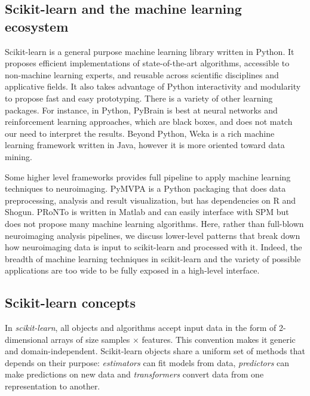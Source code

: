 \documentclass{frontiersSCNS} %
\begin{document}
\subsection{Scikit-learn and the machine learning ecosystem}

Scikit-learn \citep{pedregosa2011} is a general purpose machine learning
library written in Python.
It proposes efficient implementations of state-of-the-art algorithms,
accessible to non-machine learning experts,
and reusable across scientific disciplines and applicative fields. It also
takes advantage of Python interactivity and modularity to propose fast and easy
prototyping. There is a variety of other learning packages. For instance,
in Python, PyBrain \citep{schaul2010pybrain} is best at neural networks
and reinforcement learning approaches, which are black boxes, and does not match
our need to interpret the results.
Beyond Python, Weka \citep{hall2009weka} is a rich machine learning framework
written in Java,
however it is more oriented toward data mining. 

Some higher level frameworks provides full pipeline to apply machine
learning techniques to neuroimaging. PyMVPA is a Python packaging that 
does data preprocessing,
analysis and result visualization, but has dependencies on R and Shogun.
PRoNTo \citep{schrouff2013pronto} is written in Matlab and can easily
interface with SPM but does not propose many machine learning algorithms.
Here, rather than full-blown neuroimaging analysis pipelines, we discuss lower-level patterns that break down how neuroimaging
data is input to scikit-learn and processed with it. Indeed, the breadth
of machine learning techniques in scikit-learn and the variety of
possible applications are too wide to be fully exposed in a high-level
interface.

\subsection{Scikit-learn concepts}
\label{scikitlearn}

In {\em scikit-learn}, all objects and algorithms accept input data in the form of
2-dimensional arrays of size samples $\times$ features.
This convention makes it generic and domain-independent.
Scikit-learn objects share a uniform set of methods that
depends on their purpose: \textit{estimators} can fit models from data,
\textit{predictors} can make predictions on new data and \textit{transformers}
convert data from one representation to another.
\end{document}

